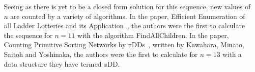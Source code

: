 Seeing as there is yet to be a closed form solution for this sequence, new values of $n$ are counted by a variety of algorithms. 
In the paper, Efficient Enumeration of all Ladder Lotteries and its Application~\cite{A1}, 
the authors were the first to calculate the sequence for $n=11$ with the algorithm {\sc FindAllChildren}. 
In the paper, Counting Primitive Sorting Networks by $\mathbb{\pi}$DDs~\cite{A29}, written by Kawahara, Minato, Saitoh and Yoshinaka, the authors
 were the first to calculate for $n=13$ with a data structure they have termed $\mathbb{\pi}$DD.
\pagebreak



